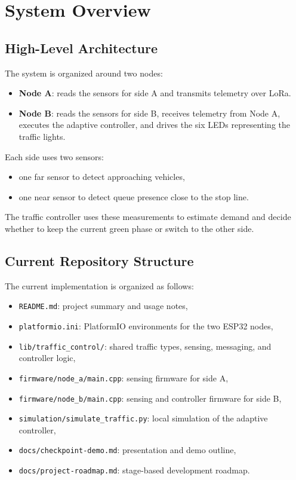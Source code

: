\documentclass[11pt,a4paper]{article}
\begin{document}
\section{System Overview}

\subsection{High-Level Architecture}

The system is organized around two nodes:

\begin{itemize}
    \item \textbf{Node A}: reads the sensors for side A and transmits telemetry over LoRa.
    \item \textbf{Node B}: reads the sensors for side B, receives telemetry from Node A, executes the adaptive controller, and drives the six LEDs representing the traffic lights.
\end{itemize}

Each side uses two sensors:

\begin{itemize}
    \item one far sensor to detect approaching vehicles,
    \item one near sensor to detect queue presence close to the stop line.
\end{itemize}

The traffic controller uses these measurements to estimate demand and decide whether to keep the current green phase or switch to the other side.

\subsection{Current Repository Structure}

The current implementation is organized as follows:

\begin{itemize}
    \item \texttt{README.md}: project summary and usage notes,
    \item \texttt{platformio.ini}: PlatformIO environments for the two ESP32 nodes,
    \item \texttt{lib/traffic\_control/}: shared traffic types, sensing, messaging, and controller logic,
    \item \texttt{firmware/node\_a/main.cpp}: sensing firmware for side A,
    \item \texttt{firmware/node\_b/main.cpp}: sensing and controller firmware for side B,
    \item \texttt{simulation/simulate\_traffic.py}: local simulation of the adaptive controller,
    \item \texttt{docs/checkpoint-demo.md}: presentation and demo outline,
    \item \texttt{docs/project-roadmap.md}: stage-based development roadmap.
\end{itemize}
\end{document}
